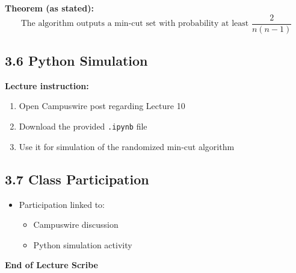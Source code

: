 \documentclass[11pt]{article}
\begin{document}
\textbf{Theorem (as stated):}
\[
\text{The algorithm outputs a min-cut set with probability at least } \frac{2}{n(n-1)}
\]

\subsection*{3.6 Python Simulation}

\textbf{Lecture instruction:}
\begin{enumerate}
    \item Open Campuswire post regarding Lecture 10
    \item Download the provided \texttt{.ipynb} file
    \item Use it for simulation of the randomized min-cut algorithm
\end{enumerate}

\subsection*{3.7 Class Participation}

\begin{itemize}
    \item Participation linked to:
    \begin{itemize}
        \item Campuswire discussion
        \item Python simulation activity
    \end{itemize}
\end{itemize}

\vspace{0.3cm}
\begin{center}
\textbf{End of Lecture Scribe}
\end{center}
\end{document}
